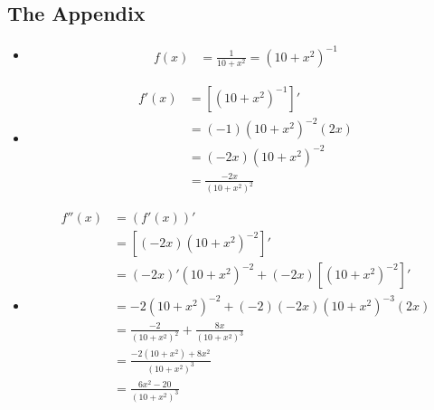 \documentclass[12pt]{article}
\begin{document}
\vspace{1cm}

\begin{center}
    \subsection*{The Appendix}
\end{center}
 \begin{itemize}
    \item 
    \begin{align*}
        f(x) &= \frac{1}{10+x^2} = \left(10+x^2 \right)^{-1}
    \end{align*}
    
    \item
    \begin{align*}
        f'(x) &= \left[\left(10+x^2 \right)^{-1} \right]'\\
        &= \left(-1 \right) \left(10+x^2 \right)^{-2} \left(2x \right)\\
        &= \left(-2x \right) \left(10+x^2 \right)^{-2}\\
        &= \frac{-2x}{\left(10+x^2 \right)^2}
    \end{align*}
    
    \item
    \begin{align*}
        f''(x) &= \left(f'(x) \right)'\\
        &= \left[ \left(-2x \right) \left(10+x^2 \right)^{-2}\right]'\\
        &= \left(-2x \right)'\left(10+x^2 \right)^{-2}
        + \left(-2x \right) \left[\left(10+x^2 \right)^{-2} \right]'\\
        &= -2\left(10+x^2 \right)^{-2}
        + \left(-2 \right) \left(-2x \right) \left(10+x^2 \right)^{-3} \left(2x \right)\\
        &= \frac{-2}{\left(10+x^2 \right)^{2}}
        + \frac{8x}{\left(10+x^2 \right)^{3}}\\
        &= \frac{-2\left(10+x^2 \right)+ 8x^2}{\left(10+x^2 \right)^{3}}\\
        &= \frac{6x^2- 20}{\left(10+x^2 \right)^{3}}
    \end{align*}
    

\end{itemize}
\end{document}
